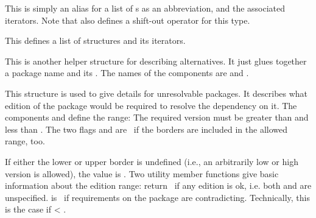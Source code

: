 \documentclass[10pt]{article}
\begin{document}
This is simply an alias for a list of s as an
abbreviation, and the associated iterators. Note that 
also defines a shift-out operator for this type.

This defines a list of  structures and its iterators.

This is another helper structure for describing alternatives. It just
glues together a package name and its . The
names of the components are  and .

This structure is used to give details for unresolvable packages. It
describes what edition of the package would be required to resolve the
dependency on it. The  components  and
 define the range: The required version must be greater than
 and less than . The two flags
 and  are \true\ if the borders are
included in the allowed range, too.

If either the lower or upper border is undefined (i.e., an arbitrarily
low or high version is allowed), the value is
. Two utility member functions
give basic information about the edition range: 
return \true\ if any edition is ok, i.e. both  and
 are unspecified.  is \true\ if
requirements on the package are contradicting. Technically, this is
the case if  < .
\end{document}
